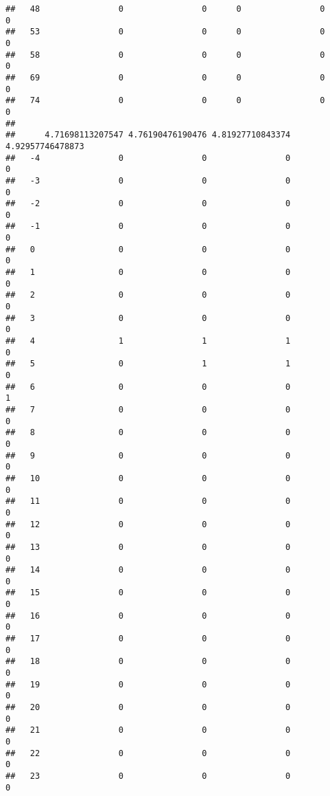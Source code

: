 \documentclass[]{article}
\begin{document}
\begin{verbatim}
##   48                0                0      0                0                0
##   53                0                0      0                0                0
##   58                0                0      0                0                0
##   69                0                0      0                0                0
##   74                0                0      0                0                0
##     
##      4.71698113207547 4.76190476190476 4.81927710843374 4.92957746478873
##   -4                0                0                0                0
##   -3                0                0                0                0
##   -2                0                0                0                0
##   -1                0                0                0                0
##   0                 0                0                0                0
##   1                 0                0                0                0
##   2                 0                0                0                0
##   3                 0                0                0                0
##   4                 1                1                1                0
##   5                 0                1                1                0
##   6                 0                0                0                1
##   7                 0                0                0                0
##   8                 0                0                0                0
##   9                 0                0                0                0
##   10                0                0                0                0
##   11                0                0                0                0
##   12                0                0                0                0
##   13                0                0                0                0
##   14                0                0                0                0
##   15                0                0                0                0
##   16                0                0                0                0
##   17                0                0                0                0
##   18                0                0                0                0
##   19                0                0                0                0
##   20                0                0                0                0
##   21                0                0                0                0
##   22                0                0                0                0
##   23                0                0                0                0

\end{verbatim}
\end{document}
